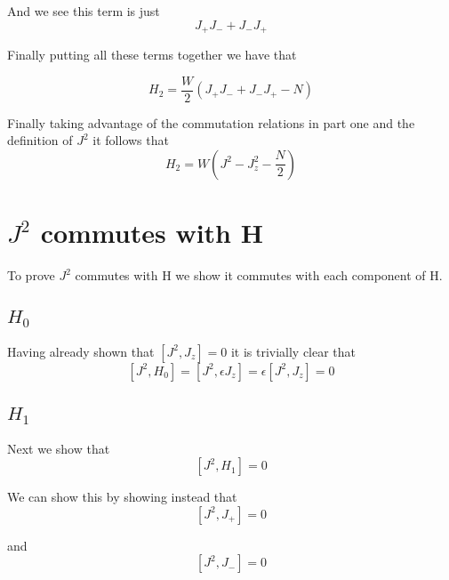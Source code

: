 \documentclass[11pt]{article} %
\begin{document}
And we see this term is just\\

\begin{equation}
J_+J_-+J_-J_+
\end{equation}

Finally putting all these terms together we have that 

\begin{equation}
H_2=\frac{W}{2}\left( J_+J_- + J_-J_+ -N\right)
\end{equation}

Finally taking advantage of the commutation relations in part one and the definition of $J^2$ it follows that\\

\begin{equation}
H_2=W\left(J^2-J_z^2-\frac{N}{2}\right)
\end{equation}


\section{$J^2$ commutes with H}

To prove $J^2$ commutes with H we show it commutes with each component of H.
\subsection{$H_0$}
 Having already shown that $\left[J^2,J_z\right]=0$ it is trivially clear that\\

\begin{equation}
\left[J^2,H_0\right]=\left[J^2,\epsilon J_z \right]=\epsilon \left[J^2,J_z \right]=0
\end{equation}
\subsection{$H_1$}
Next we show that \\

\begin{equation}
\left[J^2,H_1\right]=0
\end{equation}

We can show this by showing instead that\\

\begin{equation}
\left[J^2,J_+\right]=0
\end{equation}

and\\
\begin{equation}
\left[J^2,J_-\right]=0
\end{equation}
\end{document}
